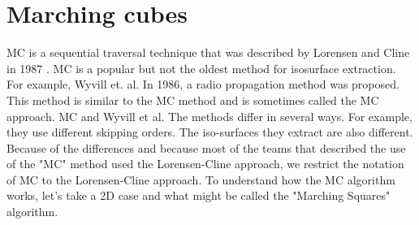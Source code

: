 \chapter{Marching cubes}
MC is a sequential traversal technique that was described by Lorensen and Cline in 1987 \cite{LorensenCline}. MC is a popular but not the oldest method for isosurface extraction. For example, Wyvill et. al. \cite{WyvillEtAl} In 1986, a radio propagation method was proposed. This method is similar to the MC method and is sometimes called the MC approach. MC and Wyvill et al. The methods differ in several ways. For example, they use different skipping orders. The iso-surfaces they extract are also different. Because of the differences and because most of the teams that described the use of the "MC" method used the Lorensen-Cline approach, we restrict the notation of MC to the Lorensen-Cline approach.
To understand how the MC algorithm works, let's take a 2D case and what might be called the "Marching Squares" algorithm.

